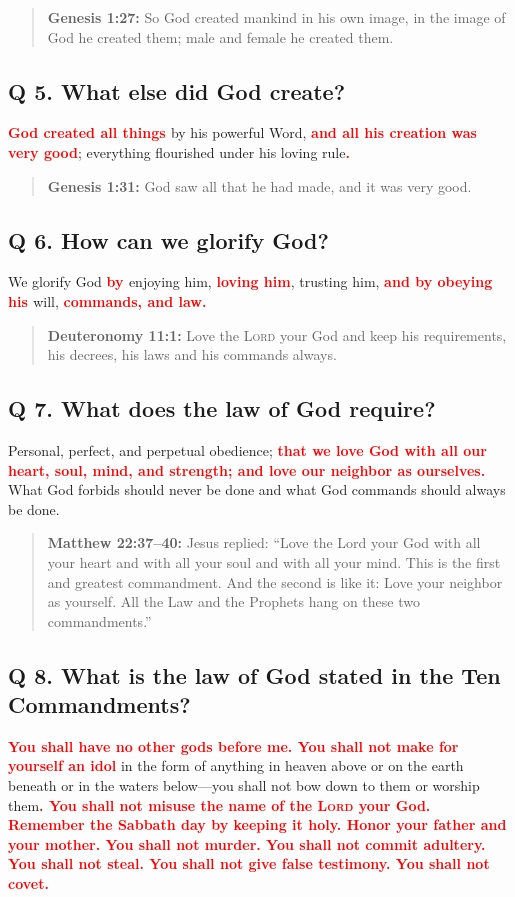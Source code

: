 \documentclass[]{memoir}
\newcommand\Children[1]{\textbf{\textcolor{red}{#1}}}
\newcommand\Quote[2]{\begin{quote}{\textbf{#1:}{ #2}}\end{quote}}
\begin{document}
\Quote{Genesis 1:27}{So God created mankind in his own image, in the image of God he created them; male and female he created them.}


\subsection{Q  5. What else did God create?}
\Children{God created all things }by his powerful Word, \Children{and all his creation was very good}; everything flourished under his loving rule\Children{.}

\Quote{Genesis 1:31}{God saw all that he had made, and it was very good.}


\subsection{Q  6. How can we glorify God?}
We glorify God \Children{by }enjoying him, \Children{loving him}, trusting him, \Children{ and by obeying his }will, \Children{commands, and law.}

\Quote{Deuteronomy 11:1}{Love the \textsc{Lord} your God and keep his requirements, his decrees, his laws and his commands always.}


\subsection{Q 7. What does the law of God require?}
Personal, perfect, and perpetual obedience; \Children{that we love God with all our heart, soul, mind, and strength; and love our neighbor as ourselves.} What God forbids should never be done and what God commands should always be done.

\Quote{Matthew 22:37--40}{Jesus replied: ``Love the Lord your God with all your heart and with all your soul and with all your mind. This is the first and greatest commandment. And the second is like it: Love your neighbor as yourself. All the Law and the Prophets hang on these two commandments.''}

\subsection{Q 8. What is the law of God stated in the Ten Commandments?}
\Children{You shall have no other gods before me. You shall not make for yourself an idol} in the form of anything in heaven above or on the earth beneath or in the waters below\thinspace{}---\thinspace{}you shall not bow down to them or worship them\Children{. You shall not misuse the name of the \textsc{Lord} your God. Remember the Sabbath day by keeping it holy. Honor your father and your mother. You shall not murder. You shall not commit adultery. You shall not steal. You shall not give false testimony. You shall not covet.}
\end{document}

